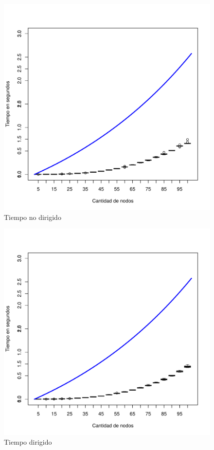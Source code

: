 \documentclass{article}%
\begin{document}
\begin{figure}[h!] 
\includegraphics[]{TiempoNoDirFinal.pdf}
\caption{Tiempo no dirigido}
\label{tnd}
\end{figure}

\begin{figure}[h!] 
\includegraphics[]{TiempoDirFinal.pdf}
\caption{Tiempo dirigido}
\label{td}
\end{figure}
 
\end{document}
